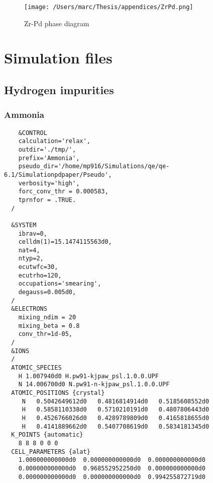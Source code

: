 \begin{figure}[H]
  \texttt{[image: /Users/marc/Thesis/appendices/ZrPd.png]}
  \caption{Zr-Pd phase diagram \cite{WATERSTRAT199963}}
\end{figure}


\chapter{Simulation files}
\section{Hydrogen impurities}
\subsection{Ammonia}
\begin{verbatim}
    &CONTROL
    calculation='relax',
    outdir='./tmp/',
    prefix='Ammonia',
    pseudo_dir='/home/mp916/Simulations/qe/qe-6.1/Simulationpdpaper/Pseudo',
    verbosity='high',
    forc_conv_thr = 0.000583,
    tprnfor = .TRUE.
  /
  
  &SYSTEM
    ibrav=0,
    celldm(1)=15.1474115563d0,
    nat=4,
    ntyp=2,
    ecutwfc=30,
    ecutrho=120,
    occupations='smearing',
    degauss=0.005d0,
  /
  &ELECTRONS
    mixing_ndim = 20
    mixing_beta = 0.8
    conv_thr=1d-05,
  /
  &IONS
  /
  ATOMIC_SPECIES
    H 1.007940d0 H.pw91-kjpaw_psl.1.0.0.UPF
    N 14.006700d0 N.pw91-n-kjpaw_psl.1.0.0.UPF
  ATOMIC_POSITIONS {crystal}
     N   0.5042649612d0   0.4816814914d0   0.5185608552d0
     H   0.5858110338d0   0.5710210191d0   0.4807806443d0
     H   0.4526766026d0   0.4289789809d0   0.4165818655d0
     H   0.4141889662d0   0.5407708619d0   0.5834181345d0
  K_POINTS {automatic}
    8 8 8 0 0 0
  CELL_PARAMETERS {alat}
    1.000000000000d0  0.000000000000d0  0.000000000000d0
    0.000000000000d0  0.968552952250d0  0.000000000000d0
    0.000000000000d0  0.000000000000d0  0.994255872719d0
\end{verbatim}
